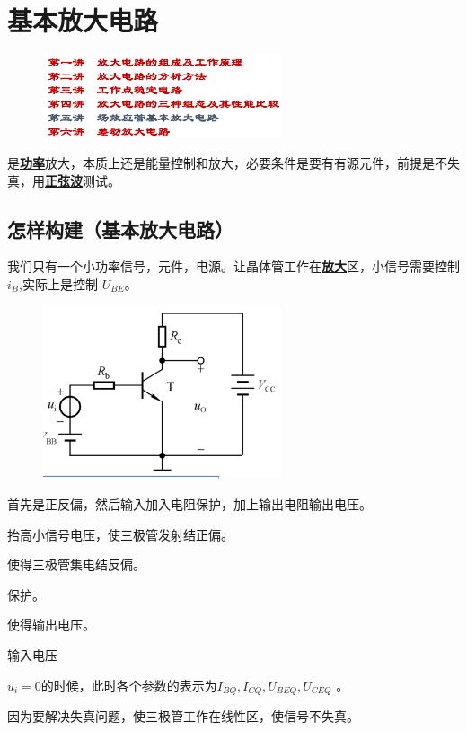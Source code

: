 \section{基本放大电路}
        \begin{figure}[H]
            \centering
            \includegraphics[width=7cm]{img/2.0.png}
            \end{figure}
是\underline{\textbf{功率}}放大，本质上还是能量控制和放大，必要条件是要有有源元件，前提是不失真，用\underline{\textbf{正弦波}}测试。

\subsection{怎样构建（基本放大电路）}
我们只有一个小功率信号，元件，电源。让晶体管工作在\underline{\textbf{放大}}区，小信号需要控制$i_B$,实际上是控制
$U_{BE}$。
        \begin{figure}[H]
            \centering
            \includegraphics[width=7cm]{img/2.1.png}
            \end{figure}
首先是正反偏，然后输入加入电阻保护，加上输出电阻输出电压。
\begin{description}[leftmargin=0.9cm,style=nextline,nosep]%
    \item[$V_{BB}$] 抬高小信号电压，使三极管发射结正偏。
    \item[$V_{\mathbb{C}}$] 使得三极管集电结反偏。
    \item[$R_b$] 保护。
    \item[$R_c$]  使得输出电压。
    \item[$u_i$] 输入电压     
    \item[静态工作点$Q$] $u_i=0$的时候，此时各个参数的表示为$I_{BQ},I_{CQ},U_{BEQ},U_{CEQ}$ 。
    \item[静态工作点的必要性] 因为要解决失真问题，使三极管工作在线性区，使信号不失真。  
\end{description}

